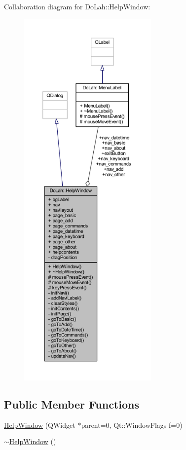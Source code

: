 Collaboration diagram for Do\+Lah\+:\+:Help\+Window\+:
\nopagebreak
\begin{figure}[H]
\begin{center}
\leavevmode
\includegraphics[height=550pt]{class_do_lah_1_1_help_window__coll__graph}
\end{center}
\end{figure}
\subsection*{Public Member Functions}
\begin{DoxyCompactItemize}
\item 
\hyperlink{class_do_lah_1_1_help_window_a745b28284dcb533c5f50eb8f67fceaec}{Help\+Window} (Q\+Widget $\ast$parent=0, Qt\+::\+Window\+Flags f=0)
\item 
\hyperlink{class_do_lah_1_1_help_window_af696920ffe4cce480cda0cc783c97614}{$\sim$\+Help\+Window} ()
\end{DoxyCompactItemize}
